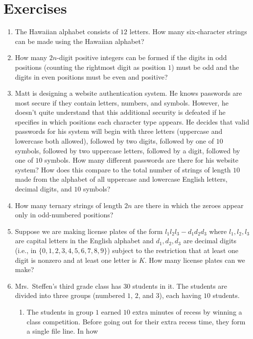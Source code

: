 \section{Exercises}\label{s:strings:exercises}
  \begin{enumerate}
  \item The Hawaiian alphabet consists of $12$ letters. How many
    six-character strings can be made using the Hawaiian alphabet?
  \item How many $2n$-digit positive integers can be formed if the
    digits in odd positions (counting the rightmost digit as position
    $1$) must be odd and the digits in even positions must be even and
    positive?
  \item Matt is designing a website authentication system. He knows
    passwords are most secure if they contain letters, numbers, and
    symbols. However, he doesn't quite understand that this additional
    security is defeated if he specifies in which positions each
    character type appears. He decides that valid passwords for his
    system will begin with three letters (uppercase and lowercase both
    allowed), followed by two digits, followed by one of $10$ symbols,
    followed by two uppercase letters, followed by a digit, followed
    by one of $10$ symbols. How many different passwords are there for
    his website system? How does this compare to the total number of
    strings of length $10$ made from the alphabet of all uppercase and
    lowercase English letters, decimal digits, and $10$ symbols?
  \item How many ternary strings of length $2n$ are there in which the
    zeroes appear only in odd-numbered positions?
  \item Suppose we are making license plates of the form
    $l_1l_2l_3-d_1d_2d_3$ where $l_1,l_2,l_3$ are capital letters in
    the English alphabet and $d_1,d_2,d_3$ are decimal digits (i.e.,
    in $\{0,1,2,3,4,5,6,7,8,9\}$) subject to the restriction that at
    least one digit is nonzero and at least one letter is $K$. How
    many license plates can we make?
  \item Mrs.\ Steffen's third grade class has $30$ students in it. The students
    are divided into three groups (numbered $1$, $2$, and $3$), each
    having $10$ students.
    \begin{enumerate}
    \item The students in group $1$ earned $10$ extra minutes of
      recess by winning a class competition. Before going out for
      their extra recess time, they form a single file line. In how

\end{enumerate}
\end{enumerate}
